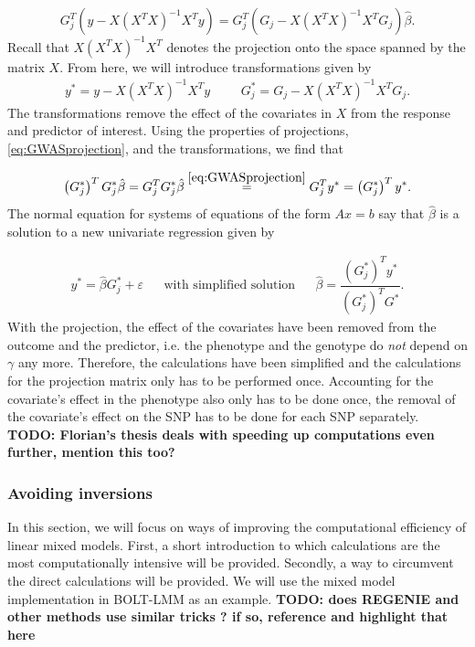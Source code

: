 \begin{equation} \label{eq:GWASprojection}
	G_j^T(y - X(X^TX)^{-1}X^Ty) = G_j^T(G_j - X(X^TX)^{-1}X^TG_j) \hat{\beta}.
\end{equation}
Recall that $ X(X^TX)^{-1}X^T $ denotes the projection onto the space spanned by the matrix $ X $. From here, we will introduce transformations given by 
\begin{align}
	y^\ast = y - X(X^TX)^{-1}X^Ty & & & G_j^{\ast} = G_j - X(X^TX)^{-1}X^TG_j.
\end{align}
The transformations remove the effect of the covariates in $ X $ from the response and predictor of interest. Using the properties of projections, \cref{eq:GWASprojection}, and the transformations, we find that 

\begin{equation}
	\left( G_j^{\ast} \right)^T G_j^{\ast} \hat{\beta} = G_j^T G_j^{\ast} \hat{\beta} \stackrel{\ref{eq:GWASprojection}}{=} G_j^T y^{\ast} = \left( G_j^{\ast} \right)^T y^{\ast}.
\end{equation}
The normal equation for systems of equations of the form $ Ax=b $ say that $ \hat{\beta} $ is a solution to a new univariate regression given by

\begin{align}\label{eq:univarGWAS}
	y^\ast = \hat{\beta} G_j^{\ast} + \varepsilon&   &\text{with simplified solution}&  &\hat{\beta} = \dfrac{\left( G_j^{\ast} \right)^T y^{\ast}}{\left( G_j^{\ast} \right)^T G^{\ast}}.
\end{align}
With the projection, the effect of the covariates have been removed from the outcome and the predictor, i.e. the phenotype and the genotype do \textit{not} depend on $ \gamma $ any more. Therefore, the calculations have been simplified and the calculations for the projection matrix only has to be performed once. Accounting for the covariate's effect in the phenotype also only has to be done once, the removal of the covariate's effect on the SNP has to be done for each SNP separately.
\textbf{TODO: Florian's thesis deals with speeding up computations even further, mention this too?}


\subsubsection{Avoiding inversions}

In this section, we will focus on ways of improving the computational efficiency of linear mixed models. First, a short introduction 
to which calculations are the most computationally intensive will be provided. Secondly, a way to circumvent the direct 
calculations will be provided. We will use the mixed model implementation in BOLT-LMM as an example. \textbf{TODO: does REGENIE and 
other methods use similar tricks ? if so, reference and highlight that here}

